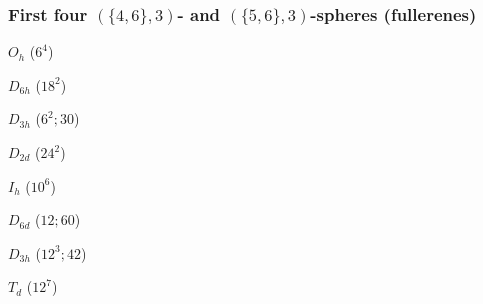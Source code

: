 \documentclass{beamer}
\begin{document}
\begin{frame}\frametitle{First four $(\{4,6\},3)$- and
$(\{5,6\},3)$-spheres (fullerenes)}
\vspace{-1.5mm}

\begin{center}
\begin{minipage}[b]{24mm}
\centering
{}\par
$O_h$ ($6^4$)
\end{minipage}
\begin{minipage}[b]{25mm}
\centering
{}\par
$D_{6h}$ ($18^2$)
\end{minipage}
\begin{minipage}[b]{24mm}
\centering
{}\par
$D_{3h}$ ($6^2;30$)
\end{minipage}
\begin{minipage}[b]{23mm}
\centering
{}\par
$D_{2d}$ ($24^2$)
\end{minipage}
\end{center}


\begin{center}
\begin{minipage}[b]{24mm}
\centering
{}\par
 $I_h$ ($10^6$)
\end{minipage}
\begin{minipage}[b]{24mm}
\centering
{}\par
 $D_{6d}$ ($12;60$)
\end{minipage}
\begin{minipage}[b]{24mm}
\centering
{}\par
 $D_{3h}$ ($12^3;42$)
\end{minipage}
\begin{minipage}[b]{24mm}
\centering
{}\par
 $T_{d}$ ($12^7$)
\end{minipage}\end{center}
\end{frame}
\end{document}
